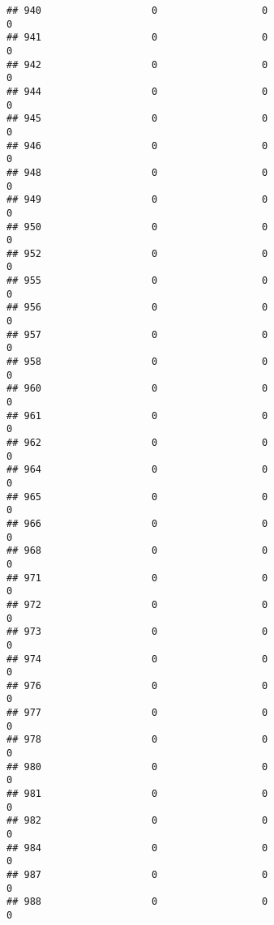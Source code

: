 \documentclass[
]{article}
\begin{document}
\begin{verbatim}
## 940                   0                  0                              0
## 941                   0                  0                              0
## 942                   0                  0                              0
## 944                   0                  0                              0
## 945                   0                  0                              0
## 946                   0                  0                              0
## 948                   0                  0                              0
## 949                   0                  0                              0
## 950                   0                  0                              0
## 952                   0                  0                              0
## 955                   0                  0                              0
## 956                   0                  0                              0
## 957                   0                  0                              0
## 958                   0                  0                              0
## 960                   0                  0                              0
## 961                   0                  0                              0
## 962                   0                  0                              0
## 964                   0                  0                              0
## 965                   0                  0                              0
## 966                   0                  0                              0
## 968                   0                  0                              0
## 971                   0                  0                              0
## 972                   0                  0                              0
## 973                   0                  0                              0
## 974                   0                  0                              0
## 976                   0                  0                              0
## 977                   0                  0                              0
## 978                   0                  0                              0
## 980                   0                  0                              0
## 981                   0                  0                              0
## 982                   0                  0                              0
## 984                   0                  0                              0
## 987                   0                  0                              0
## 988                   0                  0                              0

\end{verbatim}
\end{document}
